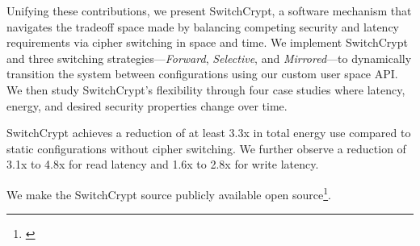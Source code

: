Unifying these contributions, we present SwitchCrypt, a software mechanism that
navigates the tradeoff space made by balancing competing security and latency
requirements via cipher switching in space and time. We implement SwitchCrypt
and three switching strategies---\emph{Forward}, \emph{Selective}, and
\emph{Mirrored}---to dynamically transition the system between configurations
using our custom user space API. We then study SwitchCrypt's flexibility through
four case studies where latency, energy, and desired security properties change
over time.

SwitchCrypt achieves a reduction of at least 3.3x in total energy use compared
to static configurations without cipher switching. We further observe a
reduction of 3.1x to 4.8x for read latency and 1.6x to 2.8x for write latency.

We make the SwitchCrypt source publicly available open
source\footnote{\label{note1}\SystemURI}.
